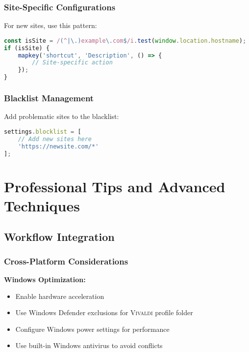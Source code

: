 \documentclass[11pt,a4paper,oneside]{book}
\newcommand{\vivaldi}{\textsc{Vivaldi}}
\begin{document}
\subsection{Site-Specific Configurations}

For new sites, use this pattern:

\begin{codebox}
\begin{lstlisting}[language=JavaScript]
const isSite = /(^|\.)example\.com$/i.test(window.location.hostname);
if (isSite) {
    mapkey('shortcut', 'Description', () => {
        // Site-specific action
    });
}
\end{lstlisting}
\end{codebox}

\subsection{Blacklist Management}

Add problematic sites to the blacklist:

\begin{codebox}
\begin{lstlisting}[language=JavaScript]
settings.blocklist = [
    // Add new sites here
    'https://newsite.com/*'
];
\end{lstlisting}
\end{codebox}

\chapter{Professional Tips and Advanced Techniques}

\section{Workflow Integration}

\subsection{Cross-Platform Considerations}

\textbf{Windows Optimization:}
\begin{itemize}
    \item Enable hardware acceleration
    \item Use Windows Defender exclusions for \vivaldi{} profile folder
    \item Configure Windows power settings for performance
    \item Use built-in Windows antivirus to avoid conflicts
\end{itemize}
\end{document}
